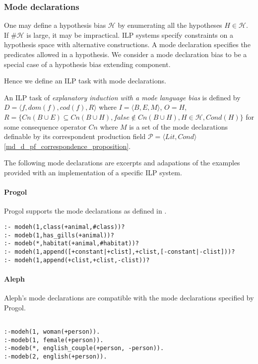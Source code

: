 \subsubsection{Mode declarations}
One may define a hypothesis bias $\mathcal{H}$ by enumerating all the hypotheses $H \in \mathcal{H}$. If $\#\mathcal{H}$ is large, it may be impractical. ILP systems specify constraints on a hypothesis space with alternative constructions. A mode declaration specifies the predicates allowed in a hypothesis. We consider a mode declaration bias to be a special case of a hypothesis bias extending component.

Hence we define an ILP task with mode declarations.

\begin{defn}
An ILP task of \emph{explanatory induction with a mode language bias} is defined by $D=\langle f, dom(f), cod(f), R \rangle$ where $I=\langle B, E, M\rangle$, $O=H$,
$R=\{Cn(B \cup E) \subseteq Cn(B \cup H), false \not\in Cn(B \cup H), H \in \mathcal{H}, Cond(H)\}$ for some consequence operator $Cn$ where $M$ is a set of the mode declarations definable by its correspondent production field $\mathcal{P}=\langle Lit, Cond \rangle$\ref{md_d_pf_correspondence_proposition}.
\end{defn}

The following mode declarations are excerpts and adapations of the examples provided with an implementation of a specific ILP system.

\paragraph{Progol}
Progol supports the mode declarations as defined in .

\begin{exmp}\cite{muggleton1999progolWebsite}
\begin{lstlisting}
:- modeh(1,class(+animal,#class))?
:- modeb(1,has_gills(+animal))?
:- modeb(*,habitat(+animal,#habitat))?
:- modeh(1,append([+constant|+clist],+clist,[-constant|-clist]))?
:- modeh(1,append(+clist,+clist,-clist))?
\end{lstlisting}
\end{exmp}

\paragraph{Aleph}
Aleph's mode declarations are compatible\cite{aleph2007} with the mode declarations specified by Progol.
\begin{exmp}
\begin{lstlisting}

:-modeh(1, woman(+person)).
:-modeb(1, female(+person)).
:-modeb(*, english_couple(+person, -person)).
:-modeb(2, english(+person)).
\end{lstlisting}
\end{exmp}

